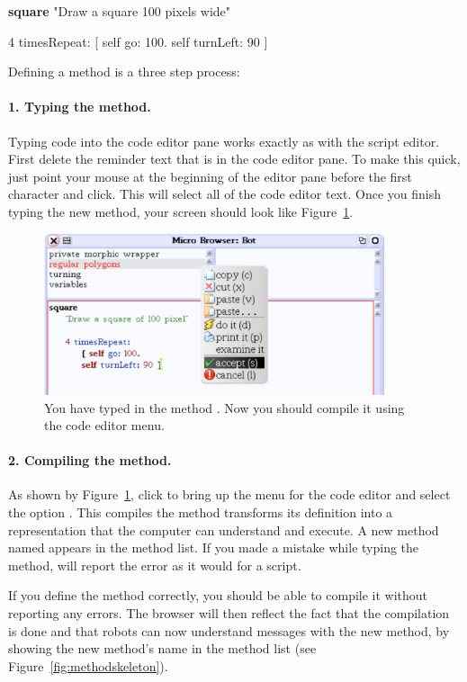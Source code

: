 \begin{method}\label{mth:square}
\textbf{square}
   "Draw a square 100 pixels wide"
   
   4 timesRepeat: 
                [ self go: 100.
                self turnLeft: 90 ]
\end{method}

Defining a method is a three step process:



\paragraph{1. Typing the method.} Typing code into the code editor 
pane works exactly as with the script editor. First delete the reminder text that is in the code editor pane. To make this quick, just point your mouse at 
the beginning of the editor pane before the first character and click. This will select all of the code editor text. Once you finish typing the new method, your screen should look like Figure~\ref{fig:firstMethod}.

\begin{figure}[h]
\centerline{\includegraphics[width=10cm]{tbFive}} 
\caption{You have typed in the method . Now you should compile it using the code editor menu.\label{fig:firstMethod}}
\end{figure}

\paragraph{2. Compiling the method.} As shown by Figure~\ref{fig:firstMethod}, click to bring up the menu  for the code editor and select the option .
This compiles the method \ie transforms its definition into a representation that the computer can understand and execute. A new method named  appears in the method list.  If you made a mistake while typing the method, \sq will report the error as it would for a script.

If you define  the method correctly, you should be able to compile it without \sq reporting any errors. The browser will then reflect the fact that the compilation is done and that robots can now understand messages with the new method, by showing the new method's name in the method list (see Figure~\ref{fig:methodskeleton}).

